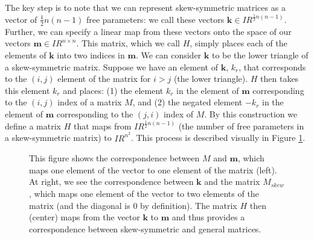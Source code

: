 \documentclass[11pt]{article}%
\def\m{{\mathbf m}}
\def\k{{\mathbf k}}
\newcommand{\reals}{I\!\!R} %
\begin{document}
The key step is to note that we can represent skew-symmetric matrices as a vector of $\frac{1}{2}n(n-1)$ free parameters: we call these vectors $\k \in \reals^{\frac{1}{2}n(n-1)}$.  Further, we can specify a linear map from these vectors onto the space of our vectors $\m \in \reals^{n \times n}$.  This matrix, which we call $H$, simply places each of the elements of $\k$ into two indices in $\m$.  We can consider $\k$ to be the lower triangle of a skew-symmetric matrix.  Suppose we have an element of $\k$, $k_r$, that corresponds to the $(i,j)$ element of the matrix for $i>j$ (the lower triangle).  $H$ then takes this element $k_r$ and places: (1) the element $k_r$ in the element of $\m$ corresponding to the $(i,j)$ index of a matrix $M$, and (2) the negated element $-k_r$ in the element of $\m$ corresponding to the $(j,i)$ index of $M$.  By this construction we define a matrix $H$ that maps from $\reals^{\frac{1}{2}n(n-1)}$ (the number of free parameters in a skew-symmetric matrix) to $\reals^{n^2}$.  This process is described visually in Figure \ref{fig:H}.    

\begin{figure}[h!]
\centering
{}
\caption{\small{This figure shows the correspondence between $M$ and $\m$, which maps one element of the vector to one element of the matrix (left).  At right, we see the correspondence between $\k$ and the matrix $M_{skew}$, which maps one element of the vector to two elements of the matrix (and the diagonal is 0 by definition).  The matrix $H$ then (center) maps from the vector $\k$ to $\m$ and thus provides a correspondence between skew-symmetric and general matrices.}}
\label{fig:H}
\end{figure}


\end{document}
